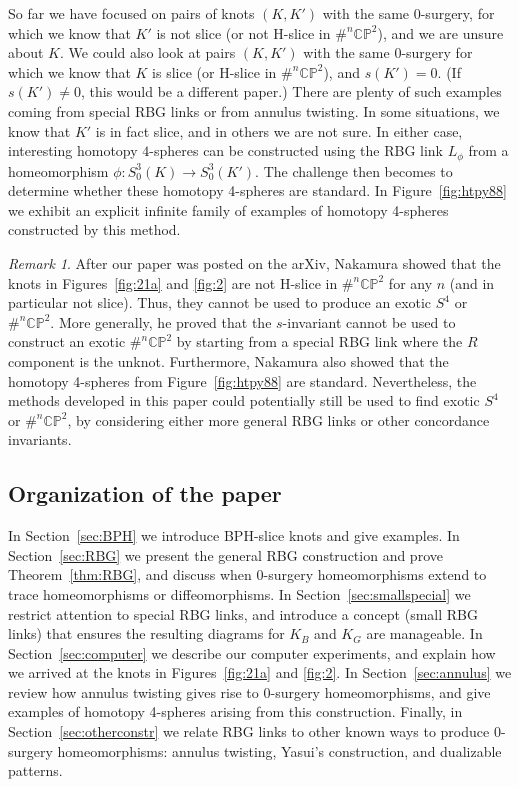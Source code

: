 \documentclass [11pt]{amsart}
\theoremstyle{remark}
\newtheorem {remark}[theorem]{Remark}
\def\CP{\mathbb{CP}^2}
\begin{document}
So far we have focused on pairs of knots $(K, K')$ with the same $0$-surgery, for which we know that $K'$ is not slice (or not H-slice in $\#^n \CP$), and we are unsure about $K$. We could also look at pairs $(K, K')$ with the same $0$-surgery for which we know that $K$ is slice (or H-slice in $\#^n \CP$), and $s(K')=0$. (If $s(K')\neq 0$, this would be a different paper.) There are plenty of such examples coming from special RBG links or from annulus twisting. In some situations, we know that $K'$ is in fact slice, and in others we are not sure. In either case, interesting homotopy $4$-spheres can be constructed using the RBG link $L_\phi$ from a  homeomorphism $\phi: S^3_0(K) \to S^3_0(K')$. The challenge then becomes to determine whether these homotopy 4-spheres are standard. In Figure~\ref{fig:htpy88} we exhibit an explicit infinite family of examples of homotopy 4-spheres constructed by this method.

\begin{remark}
\label{rem:nakamura}
 After our paper was posted on the arXiv, Nakamura \cite{Nakamura} showed that the knots in Figures~\ref{fig:21a} and \ref{fig:2} are not H-slice in $\#^n \CP$ for any $n$ (and in particular not slice). Thus, they cannot be used to produce an exotic $S^4$ or $\#^n \CP$. More generally, he proved that the $s$-invariant cannot be used to construct an exotic $\#^n \CP$ by starting from a special RBG link where the $R$ component is the unknot. Furthermore, Nakamura also showed that the homotopy 4-spheres from Figure~\ref{fig:htpy88} are standard. Nevertheless, the methods developed in this paper could potentially still be used to find exotic $S^4$ or $\#^n \CP$, by considering either more general RBG links or other concordance invariants.
\end{remark}

\subsection{Organization of the paper} In Section~\ref{sec:BPH} we introduce BPH-slice knots and give examples. In Section~\ref{sec:RBG} we present the general RBG construction and prove Theorem~\ref{thm:RBG}, and discuss when 0-surgery homeomorphisms extend to trace homeomorphisms or diffeomorphisms. In Section~\ref{sec:smallspecial} we restrict attention to special RBG links, and introduce a concept (small RBG links) that ensures the resulting diagrams for $K_B$ and $K_G$ are manageable. In Section~\ref{sec:computer} we describe our computer experiments, and explain how we arrived at the knots  in Figures~\ref{fig:21a} and \ref{fig:2}. In Section~\ref{sec:annulus} we review how annulus twisting gives rise to 0-surgery homeomorphisms, and give examples of homotopy 4-spheres arising from this construction. Finally, in Section~\ref{sec:otherconstr} we relate RBG links to other known ways to produce 0-surgery homeomorphisms: annulus twisting, Yasui's construction, and dualizable patterns.
\end{document}
